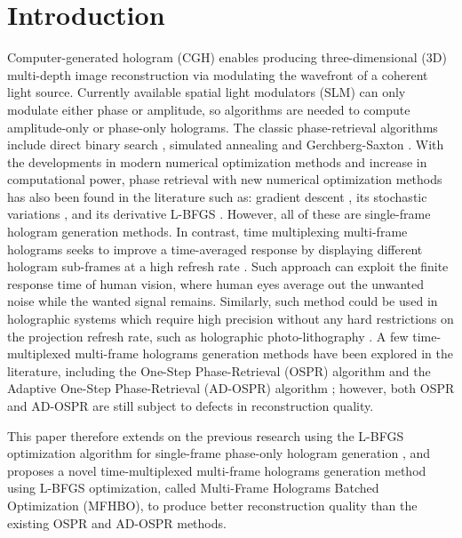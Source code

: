 \section{Introduction}
	Computer-generated hologram (CGH) enables producing three-dimensional (3D) multi-depth image reconstruction via modulating the wavefront of a coherent light source. Currently available spatial light modulators (SLM) can only modulate either phase or amplitude, so algorithms are needed to compute amplitude-only or phase-only holograms. The classic phase-retrieval algorithms include direct binary search \cite{Seldowitz1987}, simulated annealing \cite{Kirkpatrick1983} and Gerchberg-Saxton \cite{Gerchberg1972}. With the developments in modern numerical optimization methods and increase in computational power, phase retrieval with new numerical optimization methods has also been found in the literature such as: gradient descent \cite{Zhang2017, Liu2020}, its stochastic variations \cite{Chen2021, Choi2021, Kadis2022}, and its derivative L-BFGS \cite{Sha2022, Sha2023}. However, all of these are single-frame hologram generation methods. In contrast, time multiplexing multi-frame holograms seeks to improve a time-averaged response by displaying different hologram sub-frames at a high refresh rate \cite{Amako1995}. Such approach can exploit the finite response time of human vision, where human eyes average out the unwanted noise while the wanted signal remains. Similarly, such method could be used in holographic systems which require high precision without any hard restrictions on the projection refresh rate, such as holographic photo-lithography \cite{Bay2010}. A few time-multiplexed multi-frame holograms generation methods have been explored in the literature, including the One-Step Phase-Retrieval (OSPR) algorithm \cite{Cable2004} and the Adaptive One-Step Phase-Retrieval (AD-OSPR) algorithm \cite{Kaczorowski2016}; however, both OSPR and AD-OSPR are still subject to defects in reconstruction quality.
	
	This paper therefore extends on the previous research using the L-BFGS optimization algorithm for single-frame phase-only hologram generation \cite{Sha2022, Sha2023}, and proposes a novel time-multiplexed multi-frame holograms generation method using L-BFGS optimization, called Multi-Frame Holograms Batched Optimization (MFHBO), to produce better reconstruction quality than the existing OSPR and AD-OSPR methods.
	
	
